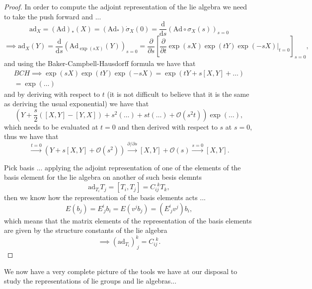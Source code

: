 \begin{proof}
    In order to compute the adjoint representation of the lie algebra we need to take the push forward and ...
    \[
        \mathrm{ad}_X = (\mathrm{Ad})_* (X) = (\mathrm{Ad}_*)\dot{\sigma}_X(0) = \frac{\mathrm{d}}{\mathrm{d} s} (\mathrm{Ad} \circ \sigma_X(s))_{s=0}
    \]
    \[
        \implies \mathrm{ad}_X (Y) = \frac{\mathrm{d}}{\mathrm{d} s} (\mathrm{Ad}_{\exp(sX)}(Y))_{s=0} = \frac{\partial}{\partial s}\left[ \frac{\partial}{\partial t} \exp(sX)\exp(tY)\exp(-sX)\big|_{t=0}\right]_{s=0},
    \]
    and using the Baker-Campbell-Hausdorff formula we have that
    \[
        \begin{aligned}
            BCH \implies \exp(sX)\exp(tY)\exp(-sX) = \exp\left( tY + s[X, Y] + \dots \right) \\
            =  \exp(\dots )
        \end{aligned}
    \]
    and by deriving with respect to \(t\) (it is not difficult to believe that it is the same as deriving the usual exponential) we have that
    \[
        \left(Y + \frac{s}{2} ([X, Y] - [Y, X]) + s^2 (\dots) + st(\dots) + \mathcal{O}(s^2t)\right) \exp(\dots),
    \]
    which needs to be evaluated at \(t=0\) and then derived with respect to \(s\) at \(s=0\), thus we have that
    \[
        \xrightarrow{t=0} \left(Y + s[X,Y] + \mathcal{O}(s^2)\right) \xrightarrow{\partial / \partial s} [X, Y] + \mathcal{O}(s) \xrightarrow{s=0} [X, Y].
    \]

    Pick basis ... applying the adjoint representation of one of the elements of the basis element for the lie algebra on another of such besis elemnts
    \[
        \mathrm{ad}_{T_i}T_j = [T_i, T_j] = C_{ij}^{\ \ k} T_k,
    \]
    then we know how the representation of the basis elements acts ...
    \[
        E(b_j) = E^i_{\ j} b_i = E(v^j b_j) = (E^i_{\ j}v^j)b_i,
    \]
    which means that the matrix elements of the representation of the basis elements are given by the structure constants of the lie algebra
    \[
        \implies (\mathrm{ad}_{T_i})^k_{\ j} = C_{ij}^{\ \ k}.
    \]
\end{proof}

We now have a very complete picture of the tools we have at our disposal to study the representations of lie groups and lie algebras...

